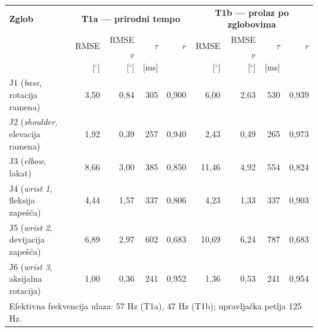 \begin{tabular}{l rrrr rrrr}
\hline
\textbf{Zglob} & \multicolumn{4}{c}{\textbf{T1a --- prirodni tempo}} & \multicolumn{4}{c}{\textbf{T1b --- prolaz po zglobovima}} \\
 & \small RMSE & \small RMSE$_\text{p}$ & \small $\tau$ & \small $r$ & \small RMSE & \small RMSE$_\text{p}$ & \small $\tau$ & \small $r$ \\
 & \small [$^\circ$] & \small [$^\circ$] & \small [ms] &  & \small [$^\circ$] & \small [$^\circ$] & \small [ms] & \\
\hline
J1 (\textit{base}, rotacija ramena) & 3,50 & 0,84 & 305 & 0,900 & 6,00 & 2,63 & 530 & 0,939 \\
J2 (\textit{shoulder}, elevacija ramena) & 1,92 & 0,39 & 257 & 0,940 & 2,43 & 0,49 & 265 & 0,973 \\
J3 (\textit{elbow}, lakat) & 8,66 & 3,00 & 385 & 0,850 & 11,46 & 4,92 & 554 & 0,824 \\
J4 (\textit{wrist 1}, fleksija zapešća) & 4,44 & 1,57 & 337 & 0,806 & 4,23 & 1,33 & 337 & 0,903 \\
J5 (\textit{wrist 2}, devijacija zapešća) & 6,89 & 2,97 & 602 & 0,683 & 10,69 & 6,24 & 787 & 0,683 \\
J6 (\textit{wrist 3}, aksijalna rotacija) & 1,00 & 0,36 & 241 & 0,952 & 1,36 & 0,53 & 241 & 0,954 \\
\hline
\multicolumn{9}{l}{\small Efektivna frekvencija ulaza: 57 Hz (T1a), 47 Hz (T1b); upravljačka petlja 125 Hz.} \\
\end{tabular}
